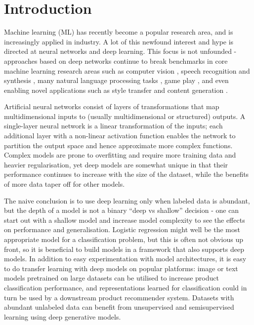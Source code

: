 \chapter{Introduction}


Machine learning (ML) has recently become a popular research area, and is increasingly applied in industry.
A lot of this newfound interest and hype is directed at  neural networks and deep learning.
This focus is not unfounded - approaches based on deep networks continue to break benchmarks in  core machine learning research areas such as computer vision \cite{sota_img1, sota_img2, sota_img3}, speech recognition and synthesis \cite{sota_asr, wavenet}, many natural language processing tasks \cite{sota_nlp1, sota_nlp2, sota_nlp3}, game play \cite{alphago, deepstack}, and even enabling novel applications such as style transfer \cite{style_transfer} and content generation \cite{gan}.

Artificial neural networks consist of layers of transformations that map multidimensional inputs to (usually multidimensional or structured) outputs.
A single-layer neural network is a linear transformation of the inputs; each additional layer with a non-linear activation function enables the network to partition the output space and hence approximate more complex functions.
Complex models are prone to overfitting and require more training data and heavier regularisation, yet deep models are somewhat unique in that their performance continues to increase with the size of the dataset, while the benefits of more data taper off for other models.

The naive conclusion is to use deep learning only when labeled data is abundant, but the depth of a model is not a binary ``deep vs shallow'' decision - one can start out with a shallow model and increase model complexity to see the effects on performance and generalisation.
Logistic regression might well be the most appropriate model for a classification problem, but this is often not obvious up front, so it is beneficial to build models in a framework that also supports deep models.
In addition to easy experimentation with model architectures, it is easy to do transfer learning with deep models on popular platforms: image or text models pretrained on large datasets can be utilised to increase product classification performance, and representations learned for classification could in turn be used by a downstream product recommender system.
Datasets with abundant unlabeled data can benefit from unsupervised and semisupervised learning using deep generative models.

